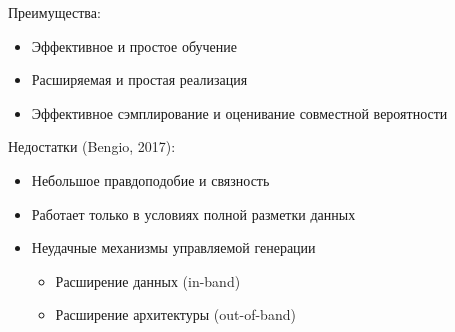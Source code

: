 \documentclass[10pt]{beamer}
\begin{document}
\begin{frame}
Преимущества:
\begin{itemize}
    \item Эффективное и простое обучение
    \item Расширяемая и простая реализация
    \item Эффективное сэмплирование и оценивание совместной вероятности
\end{itemize}

Недостатки (Bengio, 2017):
\begin{itemize}
    \item Небольшое правдоподобие и связность
    \item Работает только в условиях полной разметки данных
    \item Неудачные механизмы управляемой генерации
    \begin{itemize}
        \item Расширение данных (in-band)
        \item Расширение архитектуры (out-of-band)
    \end{itemize}
\end{itemize}

\end{frame}
\end{document}
